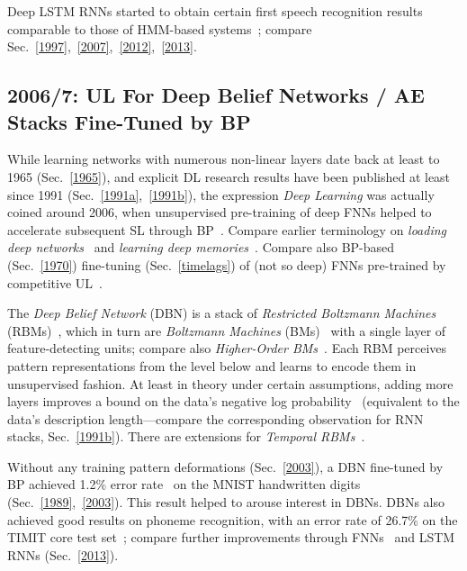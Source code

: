 \documentclass[letterpaper]{article}
\begin{document}
\begin{CJK*}{UTF8}{gbsn}
Deep LSTM RNNs started to obtain certain first speech recognition results comparable to those of 
HMM-based systems~\citep{graves+eck+beringer+schmidhuber:2003}; compare Sec.~\ref{1997},~\ref{2007},~\ref{2012},~\ref{2013}. 




\subsection{2006/7: UL For Deep Belief Networks  / AE Stacks Fine-Tuned by BP}
\label{2006}

While learning networks with numerous non-linear layers
date back at least to 1965 (Sec.~\ref{1965}),
and explicit DL research results have been published at least since 1991 (Sec.~\ref{1991a},~\ref{1991b}), 
the expression {\em Deep Learning}  was actually 
coined around 2006, 
when   unsupervised pre-training of deep FNNs helped 
to accelerate subsequent SL through BP~\citep{HinSal06,hinton:06afast}.
Compare earlier terminology on {\em loading deep networks}~\citep{sima1994,windisch2005} 
and {\em learning deep memories}~\citep{Gomez:05gecco}. 
Compare also BP-based (Sec.~\ref{1970}) fine-tuning (Sec.~\ref{timelags}) of (not so deep) FNNs 
pre-trained by competitive UL~\citep{maclin1995}.

The {\em Deep Belief Network} (DBN) is a  
stack of {\em Restricted Boltzmann Machines} (RBMs)~\citep{smolensky86}, 
which in turn are {\em Boltzmann Machines} (BMs)~\citep{HintonSejnowski:86} 
with a single layer of feature-detecting units;
compare also {\em Higher-Order BMs}~\citep{memisevic2010}.
Each RBM perceives pattern representations from the level below and learns to encode
them in unsupervised fashion.
At least in theory under certain assumptions, 
adding more layers improves a bound on the data's negative log probability~\citep{hinton:06afast} 
(equivalent to the data's 
description length---compare the corresponding observation for RNN stacks, Sec.~\ref{1991b}).  
There are extensions for {\em Temporal RBMs}~\citep{sutskever2008}.


Without any training pattern deformations (Sec.~\ref{2003}),
a DBN fine-tuned by BP
achieved 1.2\% error rate~\citep{HinSal06} on the MNIST handwritten digits
(Sec.~\ref{1989},~\ref{2003}).
This result 
helped to arouse interest in DBNs. 
DBNs  also achieved good results on phoneme recognition,
with an error rate of 26.7\% on the
TIMIT core test set~\citep{mohamed2010};
compare further improvements through FNNs~\citep{speech2012,lideng2014}
and LSTM RNNs (Sec.~\ref{2013}).  


\end{CJK*}
\end{document}
